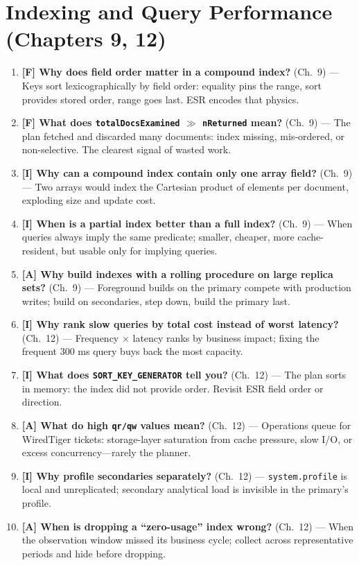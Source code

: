 \section{Indexing and Query Performance (Chapters 9, 12)}
\begin{enumerate}
    \item \textbf{[F] Why does field order matter in a compound index?} (Ch.~9) --- Keys sort lexicographically by field order: equality pins the range, sort provides stored order, range goes last. ESR encodes that physics.
    \item \textbf{[F] What does \texttt{totalDocsExamined} $\gg$ \texttt{nReturned} mean?} (Ch.~9) --- The plan fetched and discarded many documents: index missing, mis-ordered, or non-selective. The clearest signal of wasted work.
    \item \textbf{[I] Why can a compound index contain only one array field?} (Ch.~9) --- Two arrays would index the Cartesian product of elements per document, exploding size and update cost.
    \item \textbf{[I] When is a partial index better than a full index?} (Ch.~9) --- When queries always imply the same predicate; smaller, cheaper, more cache-resident, but usable only for implying queries.
    \item \textbf{[A] Why build indexes with a rolling procedure on large replica sets?} (Ch.~9) --- Foreground builds on the primary compete with production writes; build on secondaries, step down, build the primary last.
    \item \textbf{[I] Why rank slow queries by total cost instead of worst latency?} (Ch.~12) --- Frequency $\times$ latency ranks by business impact; fixing the frequent 300 ms query buys back the most capacity.
    \item \textbf{[I] What does \texttt{SORT\_KEY\_GENERATOR} tell you?} (Ch.~12) --- The plan sorts in memory: the index did not provide order. Revisit ESR field order or direction.
    \item \textbf{[A] What do high \texttt{qr/qw} values mean?} (Ch.~12) --- Operations queue for WiredTiger tickets: storage-layer saturation from cache pressure, slow I/O, or excess concurrency---rarely the planner.
    \item \textbf{[I] Why profile secondaries separately?} (Ch.~12) --- \texttt{system.profile} is local and unreplicated; secondary analytical load is invisible in the primary's profile.
    \item \textbf{[A] When is dropping a ``zero-usage'' index wrong?} (Ch.~12) --- When the observation window missed its business cycle; collect across representative periods and hide before dropping.
\end{enumerate}

